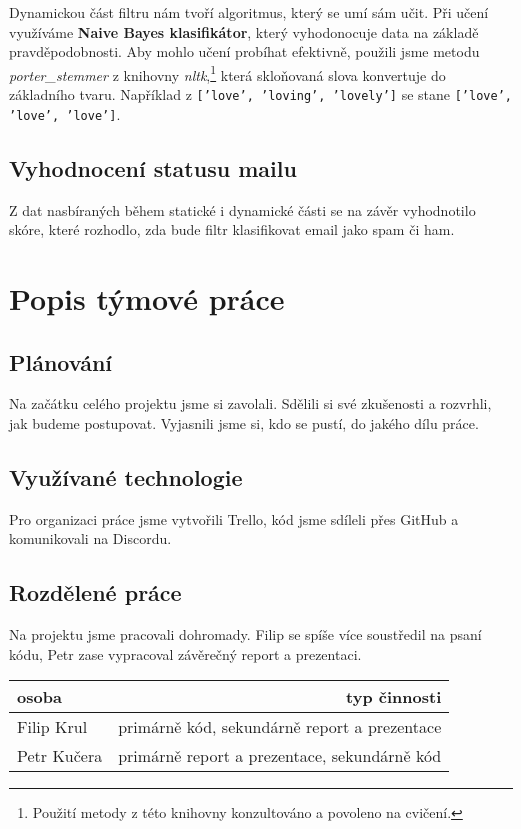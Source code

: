 \documentclass[12pt]{article}
\begin{document}
Dynamickou část filtru nám tvoří algoritmus, který se umí sám učit. Při učení využíváme \textbf{Naive Bayes klasifikátor}, který vyhodonocuje data na základě pravděpodobnosti. Aby mohlo učení probíhat efektivně, použili jsme metodu \emph{porter\_stemmer} z knihovny \emph{nltk},\footnote{Použití metody z této knihovny konzultováno a povoleno na cvičení.} která skloňovaná slova konvertuje do základního tvaru. Například z \texttt{['love', 'loving', 'lovely']} se stane \texttt{['love', 'love', 'love']}.

\subsection{Vyhodnocení statusu mailu}

Z dat nasbíraných během statické i dynamické části se na závěr vyhodnotilo skóre, které rozhodlo, zda bude filtr klasifikovat email jako spam či ham.

\section{Popis týmové práce}

\subsection{Plánování}

Na začátku celého projektu jsme si zavolali. Sdělili si své zkušenosti a rozvrhli, jak budeme postupovat. Vyjasnili jsme si, kdo se pustí, do jakého dílu práce.

\subsection{Využívané technologie}

Pro organizaci práce jsme vytvořili Trello, kód jsme sdíleli přes GitHub a komunikovali na Discordu.

\subsection{Rozdělené práce}

Na projektu jsme pracovali dohromady. Filip se spíše více soustředil na psaní kódu, Petr zase vypracoval závěrečný report a prezentaci.

\begin{center}
\begin{tabular}{l|r}
osoba & typ činnosti\\\hline
Filip Krul & primárně kód, sekundárně report a prezentace \\
Petr Kučera & primárně report a prezentace, sekundárně kód
\end{tabular}
\end{center}
\end{document}
